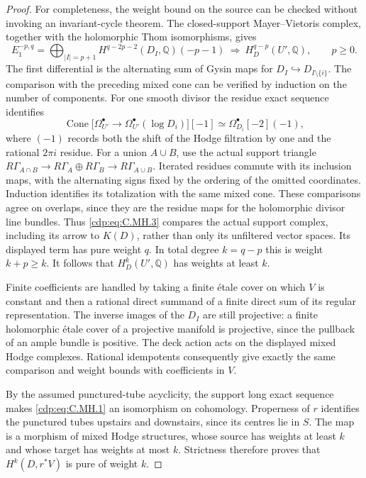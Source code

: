 \begin{proof}
For completeness, the weight bound on the source can
be checked without invoking an invariant-cycle theorem.
The closed-support Mayer--Vietoris complex, together
with the holomorphic Thom isomorphisms, gives
\[
 E_1^{-p,q}=
 \bigoplus_{|I|=p+1}
 H^{q-2p-2}(D_I,\mathbb Q)(-p-1)
 \ \Longrightarrow\ H_D^{q-p}(U',\mathbb Q),
 \qquad p\ge0.
 \tag{C.MH.3}\label{cdp:eq:C.MH.3}
\]
The first differential is the alternating sum of Gysin
maps for $D_I\hookrightarrow D_{I\setminus\{i\}}$.
The comparison with the preceding mixed cone can be
verified by induction on the number of components.
For one smooth divisor the residue exact sequence
identifies
\[
 \operatorname{Cone}\bigl[\Omega_{U'}^\bullet
       \longrightarrow\Omega_{U'}^\bullet(\log D_i)\bigr][-1]
       \simeq\Omega_{D_i}^\bullet[-2](-1),
\]
where $(-1)$ records both the shift of the Hodge
filtration by one and the rational $2\pi i$ residue.
For a union $A\cup B$, use the actual support triangle
$R\Gamma_{A\cap B}\to R\Gamma_A\oplus R\Gamma_B
\to R\Gamma_{A\cup B}$. Iterated residues commute
with its inclusion maps, with the alternating signs
fixed by the ordering of the omitted coordinates.
Induction identifies its totalization with the same
mixed cone. These comparisons agree on overlaps,
since they are the residue maps for the holomorphic
divisor line bundles. Thus \eqref{cdp:eq:C.MH.3} compares the actual support
complex, including its arrow to $K(D)$, rather than
only its unfiltered vector spaces. Its displayed term
has pure weight $q$. In total degree $k=q-p$ this is
weight $k+p\ge k$. It follows that $H_D^k(U',\mathbb Q)$
has weights at least $k$.

Finite coefficients are handled by taking a finite
\'{e}tale cover on which $V$ is constant and then a
rational direct summand of a finite direct sum of its
regular representation.
The inverse images of the $D_I$ are still projective:
a finite holomorphic \'{e}tale cover of a
projective manifold is projective, since the pullback
of an ample bundle is positive. The deck action acts
on the displayed mixed Hodge complexes. Rational
idempotents consequently give exactly the same
comparison and weight bounds with coefficients in $V$.

By the assumed punctured-tube acyclicity, the support
long exact sequence makes \eqref{cdp:eq:C.MH.1} an isomorphism on
cohomology. Properness of $r$ identifies the punctured
tubes upstairs and downstairs, since its centres lie
in $S$. The map is a morphism of mixed Hodge structures,
whose source has weights at least $k$ and whose target
has weights at most $k$. Strictness therefore proves
that $H^k(D,r^*V)$ is pure of weight $k$.


\end{proof}

